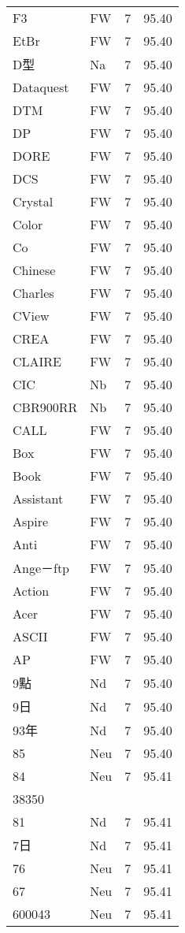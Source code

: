 \documentclass[twocolumn]{book}
\begin{document}
\begin{supertabular}{llrr}
F3 & FW & 7 &  95.40\\
EtBr & FW & 7 &  95.40\\
D型 & Na & 7 &  95.40\\
Dataquest & FW & 7 &  95.40\\
DTM & FW & 7 &  95.40\\
DP & FW & 7 &  95.40\\
DORE & FW & 7 &  95.40\\
DCS & FW & 7 &  95.40\\
Crystal & FW & 7 &  95.40\\
Color & FW & 7 &  95.40\\
Co & FW & 7 &  95.40\\
Chinese & FW & 7 &  95.40\\
Charles & FW & 7 &  95.40\\
CView & FW & 7 &  95.40\\
CREA & FW & 7 &  95.40\\
CLAIRE & FW & 7 &  95.40\\
CIC & Nb & 7 &  95.40\\
CBR900RR & Nb & 7 &  95.40\\
CALL & FW & 7 &  95.40\\
Box & FW & 7 &  95.40\\
Book & FW & 7 &  95.40\\
Assistant & FW & 7 &  95.40\\
Aspire & FW & 7 &  95.40\\
Anti & FW & 7 &  95.40\\
Ange－ftp & FW & 7 &  95.40\\
Action & FW & 7 &  95.40\\
Acer & FW & 7 &  95.40\\
ASCII & FW & 7 &  95.40\\
AP & FW & 7 &  95.40\\
9點 & Nd & 7 &  95.40\\
9日 & Nd & 7 &  95.40\\
93年 & Nd & 7 &  95.40\\
85 & Neu & 7 &  95.40\\
84 & Neu & 7 &  95.41\\
38350\\
81 & Nd & 7 &  95.41\\
7日 & Nd & 7 &  95.41\\
76 & Neu & 7 &  95.41\\
67 & Neu & 7 &  95.41\\
600043 & Neu & 7 &  95.41\\

\end{supertabular}
\end{document}
